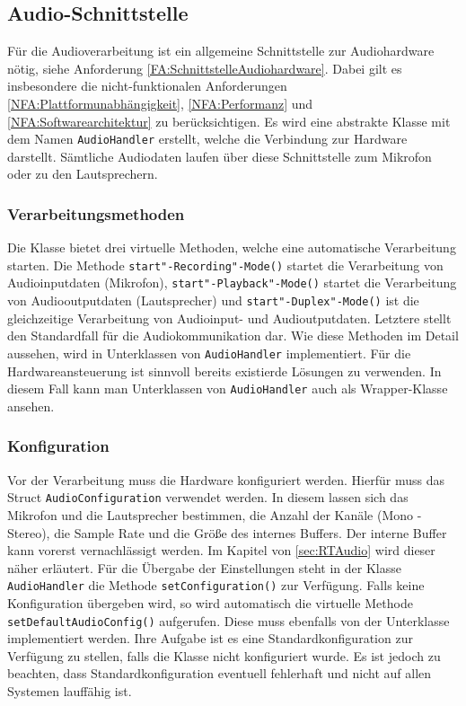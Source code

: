 \subsection{Audio-Schnittstelle}
Für die Audioverarbeitung ist ein allgemeine Schnittstelle zur Audiohardware nötig, siehe Anforderung \ref{FA:SchnittstelleAudiohardware}. Dabei gilt es insbesondere die nicht-funktionalen Anforderungen \ref{NFA:Plattformunabhängigkeit}, \ref{NFA:Performanz} und \ref{NFA:Softwarearchitektur} zu berücksichtigen. Es wird eine abstrakte Klasse mit dem Namen \texttt{AudioHandler} erstellt, welche die Verbindung zur Hardware darstellt. Sämtliche Audiodaten laufen über diese Schnittstelle zum Mikrofon oder zu den Lautsprechern. 

\subsubsection{Verarbeitungsmethoden}
Die Klasse bietet drei virtuelle Methoden, welche eine automatische Verarbeitung starten. Die Methode \texttt{start"-Recording"-Mode()} startet die Verarbeitung von Audioinputdaten (Mikrofon), \texttt{start"-Playback"-Mode()} startet die Verarbeitung von Audiooutputdaten (Lautsprecher) und \texttt{start"-Duplex"-Mode()} ist die gleichzeitige Verarbeitung von Audioinput- und Audioutputdaten. Letztere stellt den Standardfall für die Audiokommunikation dar. Wie diese Methoden im Detail aussehen, wird in Unterklassen von \texttt{AudioHandler} implementiert. Für die Hardwareansteuerung ist sinnvoll bereits existierde Lösungen zu verwenden. In diesem Fall kann man Unterklassen von \texttt{AudioHandler} auch als Wrapper-Klasse ansehen.

\subsubsection{Konfiguration}
Vor der Verarbeitung muss die Hardware konfiguriert werden. Hierfür muss das Struct \texttt{AudioConfiguration} verwendet werden. In diesem lassen sich das Mikrofon und die Lautsprecher bestimmen, die Anzahl der Kanäle (Mono - Stereo), die Sample Rate und die Größe des internes Buffers. Der interne Buffer kann vorerst vernachlässigt werden. Im Kapitel von \ref{sec:RTAudio} wird dieser näher erläutert. Für die Übergabe der Einstellungen steht in der Klasse \texttt{AudioHandler} die Methode \texttt{setConfiguration()} zur Verfügung. Falls keine Konfiguration übergeben wird, so wird automatisch die virtuelle Methode \texttt{setDefaultAudioConfig()} aufgerufen. Diese muss ebenfalls von der Unterklasse implementiert werden. Ihre Aufgabe ist es eine Standardkonfiguration zur Verfügung zu stellen, falls die Klasse nicht konfiguriert wurde. Es ist jedoch zu beachten, dass Standardkonfiguration eventuell fehlerhaft und nicht auf allen Systemen lauffähig ist.

